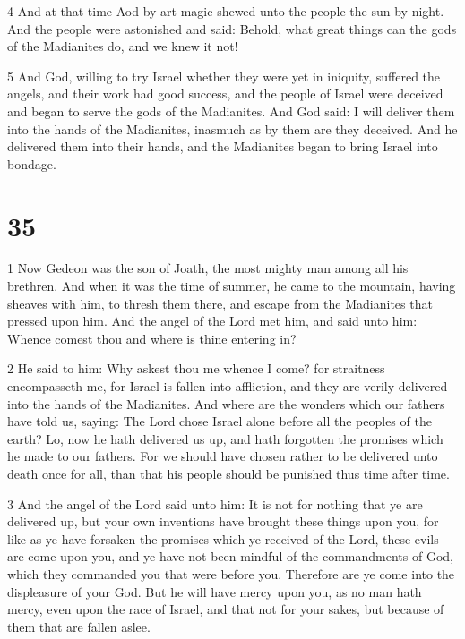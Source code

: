 \par 4 And at that time Aod by art magic shewed unto the people the sun by night. And the people were astonished and said: Behold, what great things can the gods of the Madianites do, and we knew it not! 

\par 5 And God, willing to try Israel whether they were yet in iniquity, suffered the angels, and their work had good success, and the people of Israel were deceived and began to serve the gods of the Madianites. And God said: I will deliver them into the hands of the Madianites, inasmuch as by them are they deceived. And he delivered them into their hands, and the Madianites began to bring Israel into bondage.

\chapter{35}

\par 1 Now Gedeon was the son of Joath, the most mighty man among all his brethren. And when it was the time of summer, he came to the mountain, having sheaves with him, to thresh them there, and escape from the Madianites that pressed upon him. And the angel of the Lord met him, and said unto him: Whence comest thou and where is thine entering in? 

\par 2 He said to him: Why askest thou me whence I come? for straitness encompasseth me, for Israel is fallen into affliction, and they are verily delivered into the hands of the Madianites. And where are the wonders which our fathers have told us, saying: The Lord chose Israel alone before all the peoples of the earth? Lo, now he hath delivered us up, and hath forgotten the promises which he made to our fathers. For we should have chosen rather to be delivered unto death once for all, than that his people should be punished thus time after time. 

\par 3 And the angel of the Lord said unto him: It is not for nothing that ye are delivered up, but your own inventions have brought these things upon you, for like as ye have forsaken the promises which ye received of the Lord, these evils are come upon you, and ye have not been mindful of the commandments of God, which they commanded you that were before you. Therefore are ye come into the displeasure of your God. But he will have mercy upon you, as no man hath mercy, even upon the race of Israel, and that not for your sakes, but because of them that are fallen aslee. 

